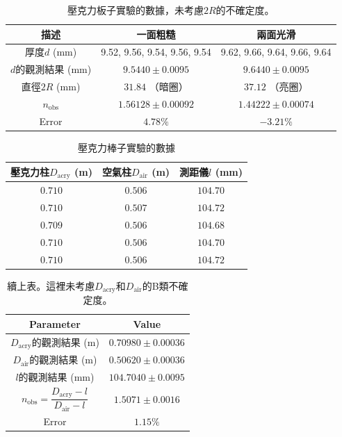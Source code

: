 \begin{table}[htb!]
\centering
\caption{壓克力板子實驗的數據，未考慮$2R$的不確定度。}
\begin{tabular}{ccc}
\toprule
描述 & 一面粗糙 & 兩面光滑 \\
\midrule
厚度$d$ (\unit{\mm}) & 9.52, 9.56, 9.54, 9.56, 9.54 & 9.62, 9.66, 9.64, 9.66, 9.64 \\
$d$的觀測結果 (\unit{\mm}) & $9.5440 \pm 0.0095$ & $9.6440 \pm 0.0095$ \\
直徑$2R$ (\unit{\mm}) & $31.84$ （暗圈） & $37.12$ （亮圈） \\
$n_{\text{obs}}$ & $1.56128 \pm 0.00092$ & $1.44222 \pm 0.00074$ \\
Error & $4.78\%$ & $-3.21\%$ \\
\bottomrule
\end{tabular}
\end{table}
\begin{table}[htb!]
\centering
\caption{壓克力棒子實驗的數據}
\begin{tabular}{ccc}
\toprule
壓克力柱$D_{\text{acry}}$ (\unit{\m}) & 空氣柱$D_{\text{air}}$ (\unit{\m}) & 測距儀$l$ (\unit{\mm}) \\
\midrule
$0.710$ & $0.506$ & $104.70$ \\
$0.710$ & $0.507$ & $104.72$ \\
$0.709$ & $0.506$ & $104.68$ \\
$0.710$ & $0.506$ & $104.70$ \\
$0.710$ & $0.506$ & $104.72$ \\
\bottomrule
\end{tabular}
\end{table}
\begin{table}[htb!]
\centering
\caption{續上表。這裡未考慮$D_{\text{acry}}$和$D_{\text{air}}$的B類不確定度。}
\begin{tabular}{cc}
\toprule
Parameter & Value \\
\midrule
$D_{\text{acry}}$的觀測結果 (\unit{\m}) & $0.70980 \pm 0.00036$ \\
$D_{\text{air}}$的觀測結果 (\unit{\m}) & $0.50620 \pm 0.00036$ \\
$l$的觀測結果 (\unit{\mm}) & $104.7040 \pm 0.0095$ \\
$n_{\text{obs}}=\dfrac{D_{\text{acry}}-l}{D_{\text{air}}-l}$ & $1.5071 \pm 0.0016$ \\
Error & $1.15\%$ \\
\bottomrule
\end{tabular}
\end{table}
